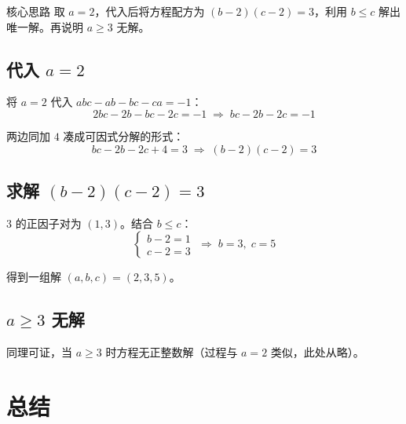 \documentclass[11pt,a4paper]{ctexart}
\begin{document}
\begin{methodbox}{核心思路}
取 $a=2$，代入后将方程配方为 $(b-2)(c-2)=3$，利用 $b \le c$ 解出唯一解。再说明 $a \ge 3$ 无解。
\end{methodbox}

\subsection*{代入 $a=2$}

将 $a=2$ 代入 $abc - ab - bc - ca = -1$：
\[
  2bc - 2b - bc - 2c = -1 \;\Longrightarrow\; bc - 2b - 2c = -1
\]

两边同加 $4$ 凑成可因式分解的形式：
\[
  bc - 2b - 2c + 4 = 3 \;\Longrightarrow\; (b-2)(c-2) = 3
\]

\subsection*{求解 $(b-2)(c-2)=3$}

$3$ 的正因子对为 $(1,3)$。结合 $b \le c$：
\[
  \begin{cases}
    b-2 = 1 \\
    c-2 = 3
  \end{cases}
  \;\Longrightarrow\;
  b = 3,\; c = 5
\]

得到一组解 $(a,b,c) = (2, 3, 5)$。

\subsection*{$a \ge 3$ 无解}

同理可证，当 $a \ge 3$ 时方程无正整数解（过程与 $a=2$ 类似，此处从略）。

\section{总结}
\end{document}
